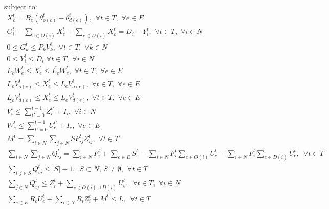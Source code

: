 \documentclass{article}
\begin{document}
	subject to:
	\begin{eqnarray}
	X_e^t = B_e (\theta_{o(e)}^t - \theta_{d(e)}^t), \hspace{5pt} \forall t \in T, \hspace{4pt} \forall e \in E\\
	G_i^t - \sum_{e \in O(i)} X_e^t + \sum_{e \in D(i)} X_e^t = D_i-Y_i^t, \hspace{4pt} \forall t \in T, \hspace{4pt} \forall i \in N\\
	0\leq G_k^t \leq P_{k} V_{k}^t, \hspace{4pt} \forall t \in T, \hspace{4pt} \forall k \in N\\
	0\leq Y_i^t \leq D_i \hspace{4pt} \forall t \in T, \hspace{4pt} \forall i \in N\\
	\underline{L_e}W_{e}^t \leq X_{e}^t \leq \overline{L_e}W_{e}^t, \hspace{4pt} \forall t \in T, \hspace{4pt} \forall e \in E\\
	\underline{L_e}V_{o(e)}^t \leq X_{e}^t \leq \overline{L_e}V_{o(e)}^t, \hspace{4pt} \forall t \in T, \hspace{4pt} \forall e \in E\\
	\underline{L_e}V_{d(e)}^t \leq X_{e}^t \leq \overline{L_e}V_{d(e)}^t, \hspace{4pt} \forall t \in T, \hspace{4pt} \forall e \in E\\
	V_i^t \leq \sum_{t'=0}^{t-1} Z_i^{t'}+I_i, \hspace{4pt} \forall i \in N\\
	W_{e}^t \leq \sum_{t'=0}^{t-1} U_{e}^{t'}+I_e, \hspace{4pt} \forall e \in E\\
	M^t = \sum_{i \in N} \sum_{j \in N} SP_{ij}^t Z_{ij}^{t},  \hspace{4pt} \forall t \in T\\
	\sum_{i \in N} \sum_{j \in N} Q_{ij}^{t} = \sum_{i \in N} F_i^t + \sum_{e \in E} S_e^t - \sum_{i \in N} F_i^t \sum_{e \in O(i)} U_e^t - \sum_{i \in N} F_i^t \sum_{e \in D(i)} U_e^t, \hspace{6pt} \forall t \in T\\
	\sum_{i,j \in S} Q_{ij}^t \leq |S|-1, \hspace{6pt} S \subset N, \hspace{2pt} S \neq \emptyset, \hspace{5pt} \forall t\in T \\
	\sum_{j \in N} Q_{ij}^t \leq Z_i^t + \sum_{e \in O(i) \cup D(i)} U_{e}^t, \hspace{6pt} \forall t \in T, \hspace{4pt} \forall i \in N \\
	\sum_{e \in E} R_{e}U_e^t + \sum_{i \in N}R_{i}Z_i^t + M^t \leq L, \hspace{6pt} \forall t \in T
	\end{eqnarray}
	
\end{document}
